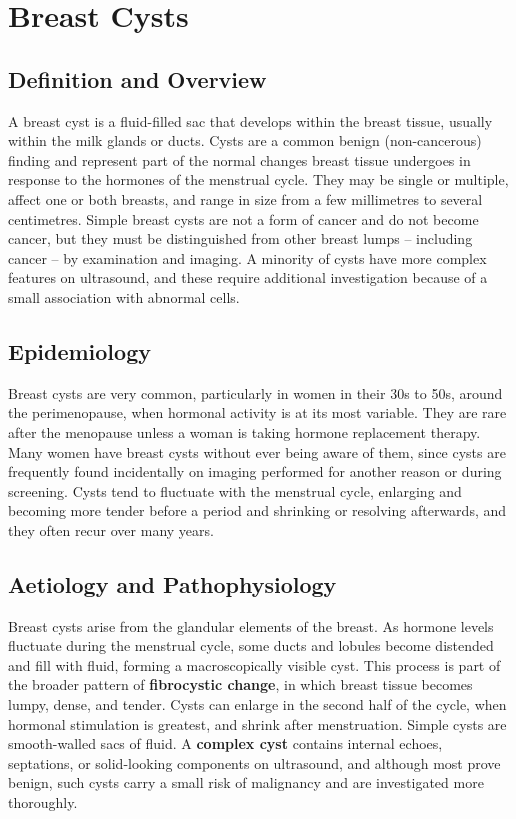 \chapter{Breast Cysts}

\section*{Definition and Overview}
A breast cyst is a fluid-filled sac that develops within the breast tissue, usually within the milk glands or ducts. Cysts are a common benign (non-cancerous) finding and represent part of the normal changes breast tissue undergoes in response to the hormones of the menstrual cycle. They may be single or multiple, affect one or both breasts, and range in size from a few millimetres to several centimetres. Simple breast cysts are not a form of cancer and do not become cancer, but they must be distinguished from other breast lumps -- including cancer -- by examination and imaging. A minority of cysts have more complex features on ultrasound, and these require additional investigation because of a small association with abnormal cells.

\section*{Epidemiology}
Breast cysts are very common, particularly in women in their 30s to 50s, around the perimenopause, when hormonal activity is at its most variable. They are rare after the menopause unless a woman is taking hormone replacement therapy. Many women have breast cysts without ever being aware of them, since cysts are frequently found incidentally on imaging performed for another reason or during screening. Cysts tend to fluctuate with the menstrual cycle, enlarging and becoming more tender before a period and shrinking or resolving afterwards, and they often recur over many years.

\section*{Aetiology and Pathophysiology}
Breast cysts arise from the glandular elements of the breast. As hormone levels fluctuate during the menstrual cycle, some ducts and lobules become distended and fill with fluid, forming a macroscopically visible cyst. This process is part of the broader pattern of \textbf{fibrocystic change}, in which breast tissue becomes lumpy, dense, and tender. Cysts can enlarge in the second half of the cycle, when hormonal stimulation is greatest, and shrink after menstruation. Simple cysts are smooth-walled sacs of fluid. A \textbf{complex cyst} contains internal echoes, septations, or solid-looking components on ultrasound, and although most prove benign, such cysts carry a small risk of malignancy and are investigated more thoroughly.

